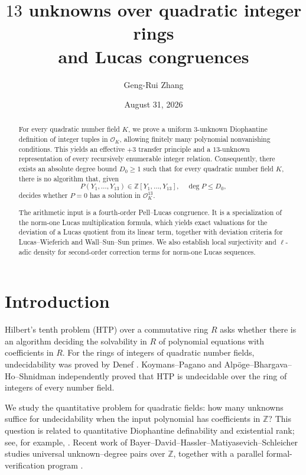 \documentclass[12pt]{amsart}
\title[$13$ unknowns and Lucas congruences]{$13$ unknowns over quadratic integer rings\\ and Lucas congruences}
\author{Geng-Rui Zhang}
\date{August 31, 2026}
\numberwithin{equation}{section}
\theoremstyle{remark}
\theoremstyle{plain}
\newcommand{\Z}{\mathbb{Z}}
\newcommand{\sO}{\mathcal{O}}
\begin{document}
\begin{abstract}
For every quadratic number field $K$, we prove a uniform $3$-unknown Diophantine definition of integer tuples in $\sO_K$, allowing finitely many polynomial nonvanishing conditions. This yields an effective $+3$ transfer principle and a $13$-unknown representation of every recursively enumerable integer relation. Consequently, there exists an absolute degree bound $D_0\geq1$ such that for every quadratic number field $K$, there is no algorithm that, given
\[
P(Y_1,\ldots,Y_{13})\in\Z[Y_1,\ldots,Y_{13}],\quad \deg P\leq D_0,
\]
decides whether $P=0$ has a solution in $\sO_K^{13}$.

The arithmetic input is a fourth-order Pell--Lucas congruence. It is a specialization of the norm-one Lucas multiplication formula, which yields exact valuations for the deviation of a Lucas quotient from its linear term, together with deviation criteria for Lucas--Wieferich and Wall--Sun--Sun primes. We also establish local surjectivity and $\ell$-adic density for second-order correction terms for norm-one Lucas sequences.
\end{abstract}

\maketitle
\tableofcontents

\section{Introduction}
Hilbert's tenth problem (HTP) over a commutative ring $R$ asks whether there is an algorithm deciding the solvability in $R$ of polynomial equations with coefficients in $R$. For the rings of integers of quadratic number fields, undecidability was proved by Denef \cite{Denef75}. Koymans--Pagano \cite{KP26} and Alp\"oge--Bhargava--Ho--Shnidman \cite{ABHS26} independently proved that HTP is undecidable over the ring of integers of every number field.

We study the quantitative problem for quadratic fields: how many unknowns suffice for undecidability when the input polynomial has coefficients in $\Z$? This question is related to quantitative Diophantine definability and existential rank; see, for example, \cite{DDF21}. Recent work of Bayer--David--Hassler--Matiyasevich--Schleicher studies universal unknown--degree pairs over $\Z$, together with a parallel formal-verification program \cite{BayerEtAl25,BayerDavid25}.
\end{document}
